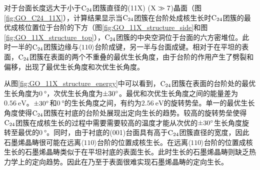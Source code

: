 对于台面长度远大于小于$\rm{C_{24}}$团簇直径的(11X) ($\rm X \gg 7 $)晶面（图\ref{fig:GO_C24_11X}），计算结果显示当$\rm{C_{24}}$团簇在台阶处成核生长时$\rm{C_{24}}$团簇的最优成核位置位于台阶的下方（图\ref{fig:GO_11X_structure_side}和图\ref{fig:GO_11X_structure_top}），$\rm{C_{24}}$团簇的中央空洞位于台面的六方密堆位。此时一半的$\rm{C_{24}}$团簇边缘与$\langle 110\rangle$台阶成键，另一半与台面成键。相对于在平坦的表面，$\rm{C_{24}}$团簇在表面的两个不重叠的最优生长角度，由于台阶的作用产生了劈裂和偏移，出现了最优生长角度和次优生长角度。

从图\ref{fig:GO_11X_structure_energy}中可以看到，$\rm{C_{24}}$团簇在表面的台阶处的最优生长角度为$\SI{0}{\degree}$，次优生长角度为$\SI{\pm 30 }{\degree}$。最优和次优生长角度之间的能量差为$\SI{0.56 }{\electronvolt}$。$\SI{\pm 30 }{\degree}$和$\SI{0}{\degree}$的生长角度之间，有约为$\SI{2.56}{\electronvolt}$的旋转势垒。单一的最优生长角度使得$\rm{C_{24}}$团簇在衬底的台阶处展现出定向生长的趋势。较高的旋转势垒使得$\rm{C_{24}}$团簇在成核生长的过程中需要需要较高的温度才能从次优的$\SI{\pm 30 }{\degree}$生长角度旋转至最优的$\SI{0 }{\degree}$。同时，由于衬底的(001)台面具有高于$\rm{C_{24}}$团簇直径的宽度，因此石墨烯晶畴很可能在远离$\langle 110\rangle$台阶的位置成核生长。在远离$\langle 110\rangle$台阶的位置成核生长的石墨烯晶畴类似于在平坦衬底的表面生长。此时生长的石墨烯晶畴则缺乏热力学上的定向趋势。因此在乃至于表面很难实现石墨烯晶畴的定向生长。

